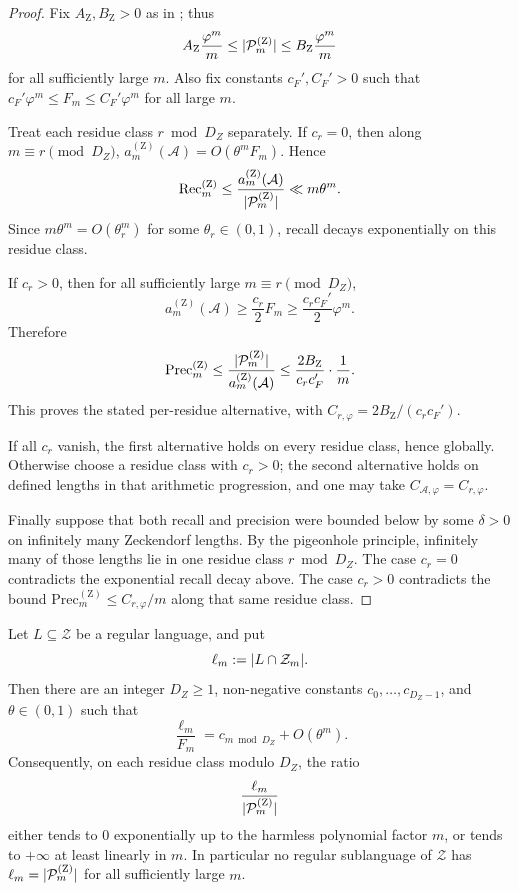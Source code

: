 \begin{proof}
  Fix \(A_{\mathrm Z},B_{\mathrm Z}>0\) as in
  ; thus
  \[
    A_{\mathrm Z}\frac{\varphi^m}{m}
    \le \lvert \mathcal P_m^{(\mathrm Z)} \rvert
    \le B_{\mathrm Z}\frac{\varphi^m}{m}
  \]
  for all sufficiently large \(m\). Also fix constants
  \(c_F',C_F'>0\) such that
  \(c_F'\varphi^m\le F_m\le C_F'\varphi^m\) for all large \(m\).

  Treat each residue class \(r\bmod D_Z\) separately. If \(c_r=0\), then
  along \(m\equiv r\pmod {D_Z}\),
  \(a_m^{(\mathrm Z)}(\mathcal A)=O(\theta^mF_m)\). Hence
  \[
    \mathrm{Rec}_m^{(\mathrm Z)}
    \le
    \frac{a_m^{(\mathrm Z)}(\mathcal A)}
         {\lvert \mathcal P_m^{(\mathrm Z)} \rvert}
    \ll m\theta^m.
  \]
  Since \(m\theta^m=O(\theta_r^m)\) for some \(\theta_r\in(0,1)\),
  recall decays exponentially on this residue class.

  If \(c_r>0\), then for all sufficiently large \(m\equiv r\pmod {D_Z}\),
  \[
    a_m^{(\mathrm Z)}(\mathcal A)\ge \frac{c_r}{2}F_m
    \ge \frac{c_rc_F'}{2}\varphi^m.
  \]
  Therefore
  \[
    \mathrm{Prec}_m^{(\mathrm Z)}
    \le
    \frac{\lvert \mathcal P_m^{(\mathrm Z)} \rvert}
         {a_m^{(\mathrm Z)}(\mathcal A)}
    \le
    \frac{2B_{\mathrm Z}}{c_rc_F'}\cdot\frac{1}{m}.
  \]
  This proves the stated per-residue alternative, with
  \(C_{r,\varphi}=2B_{\mathrm Z}/(c_rc_F')\).

  If all \(c_r\) vanish, the first alternative holds on every residue
  class, hence globally. Otherwise choose a residue class with
  \(c_r>0\); the second alternative holds on defined lengths in that
  arithmetic progression, and one may take
  \(C_{\mathcal A,\varphi}=C_{r,\varphi}\).

  Finally suppose that both recall and precision were bounded below by
  some \(\delta>0\) on infinitely many Zeckendorf lengths. By the
  pigeonhole principle, infinitely many of those lengths lie in one
  residue class \(r\bmod D_Z\). The case \(c_r=0\) contradicts the
  exponential recall decay above. The case \(c_r>0\) contradicts the
  bound \(\mathrm{Prec}_m^{(\mathrm Z)}\le C_{r,\varphi}/m\) along that
  same residue class.
\end{proof}

\begin{proposition}
  \label{prop:zeckendorf-regular-slice-rigidity}
  Let \(L\subseteq\mathcal Z\) be a regular language, and put
  \[
    \ell_m:=\lvert L\cap\mathcal Z_m \rvert.
  \]
  Then there are an integer \(D_Z\ge1\), non-negative constants
  \(c_0,\dots,c_{D_Z-1}\), and \(\theta\in(0,1)\) such that
  \[
    \frac{\ell_m}{F_m}=c_{m\bmod D_Z}+O(\theta^m).
  \]
  Consequently, on each residue class modulo \(D_Z\), the ratio
  \[
    \frac{\ell_m}{\lvert \mathcal P_m^{(\mathrm Z)} \rvert}
  \]
  either tends to \(0\) exponentially up to the harmless polynomial
  factor \(m\), or tends to \(+\infty\) at least linearly in \(m\).
  In particular no regular sublanguage of \(\mathcal Z\) has
  \(\ell_m=\lvert \mathcal P_m^{(\mathrm Z)} \rvert\) for all sufficiently
  large \(m\).
\end{proposition}

